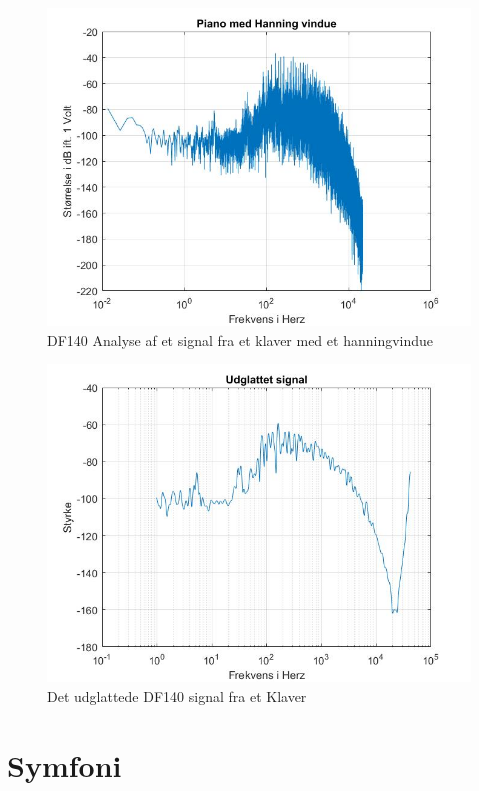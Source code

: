 \begin{figure}[H]
	\centering
	\includegraphics[width=140mm]{figures/Piano/hanning.jpg}
	\caption{DF140 Analyse af et signal fra et klaver med et hanningvindue}
	\label{fig:Klaver hanning}
\end{figure}

\begin{figure}[H]
	\centering
	\includegraphics[width=140mm]{figures/Piano/udglattet.jpg}
	\caption{Det udglattede DF140 signal fra et Klaver}
	\label{fig:Klaver udglattet}
\end{figure}
\newpage

\section{Symfoni}

